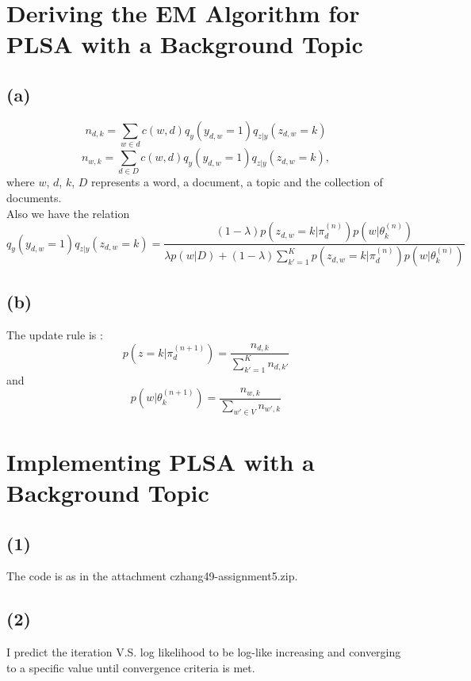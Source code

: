 \section{Deriving the EM Algorithm for PLSA with a Background Topic}
\subsection*{(a)}
\begin{equation*}
n_{d,k} = \sum_{w \in d} c(w,d)q_y(y_{d,w}=1)q_{z|y}(z_{d,w}=k)
\end{equation*}
\begin{equation*}
n_{w,k} = \sum_{d \in D} c(w,d)q_y(y_{d,w}=1)q_{z|y}(z_{d,w}=k),
\end{equation*}
where $w$, $d$, $k$, $D$ represents a word, a document, a topic and the collection of documents. \\
Also we have the relation 
\begin{equation*}
q_y(y_{d,w}=1)q_{z|y}(z_{d,w}=k) = \dfrac{(1-\lambda)p(z_{d,w}=k|\pi_d^{(n)})p(w|\theta_k^{(n)})}{\lambda p(w|D)+(1-\lambda)\sum_{k'=1}^K p(z_{d,w}=k|\pi_d^{(n)})p(w|\theta_k^{(n)})}
\end{equation*}

\subsection*{(b)}
The update rule is :
\begin{equation*}
p(z=k|\pi_d^{(n+1)}) = \dfrac{n_{d,k}}{\sum_{k'=1}^K n_{d,k'}}
\end{equation*}
and
\begin{equation*}
p(w|\theta_k^{(n+1)}) = \dfrac{n_{w,k}}{\sum_{w'\in V} n_{w',k}}
\end{equation*}

\section{Implementing PLSA with a Background Topic}
\subsection*{(1)}
The code is as in the attachment czhang49-assignment5.zip.

\subsection*{(2)}
I predict the iteration V.S. log likelihood to be log-like increasing and converging to a specific value until convergence criteria is met. 

